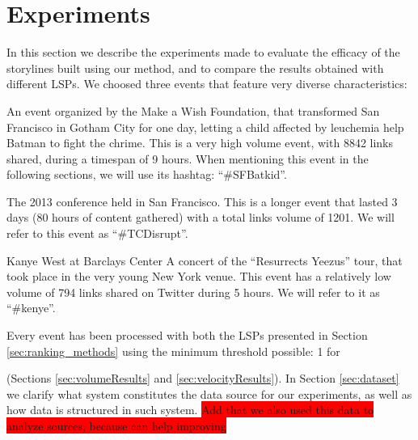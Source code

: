 \documentclass{sig-alternate}
\newcommand{\todo}[1]{\colorbox{red}{#1}}
\begin{document}
\section{Experiments}
\label{sec:experiment}
In this section we describe the experiments made to evaluate the efficacy of the storylines built using our method, and to compare the results obtained with different LSPs. We choosed three events that feature very diverse characteristics:
\begin{description}
\item[San Francisco's Batkid] An event organized by the Make a Wish Foundation, that transformed San Francisco in Gotham City for one day, letting a child affected by leuchemia help Batman to fight the chrime. This is a very high volume event, with 8842 links shared, during a timespan of 9 hours. When mentioning this event in the following sections, we will use its hashtag: ``#SFBatkid''.
\item[Tech Crunch Disrupt] The 2013 conference held in San Francisco. This is a longer event that lasted 3 days (80 hours of content gathered) with a total links volume of 1201. We will refer to this event as ``#TCDisrupt''.
\item{Kanye West at Barclays Center} A concert of the ``Resurrects Yeezus'' tour, that took place in the very young New York venue. This event has a relatively low volume of 794 links shared on Twitter during 5 hours. We will refer to it as ``#kenye''.
\end{description}
Every event has been processed with both the LSPs presented in Section \ref{sec:ranking_methods} using the minimum threshold possible: 1 for  

 (Sections \ref{sec:volumeResults} and \ref{sec:velocityResults}). In Section \ref{sec:dataset} we clarify what system constitutes the data source for our experiments, as well as how data is structured in such system.
\todo{Add that we also used this data to analyze sources, because can help improving}
\end{document}

